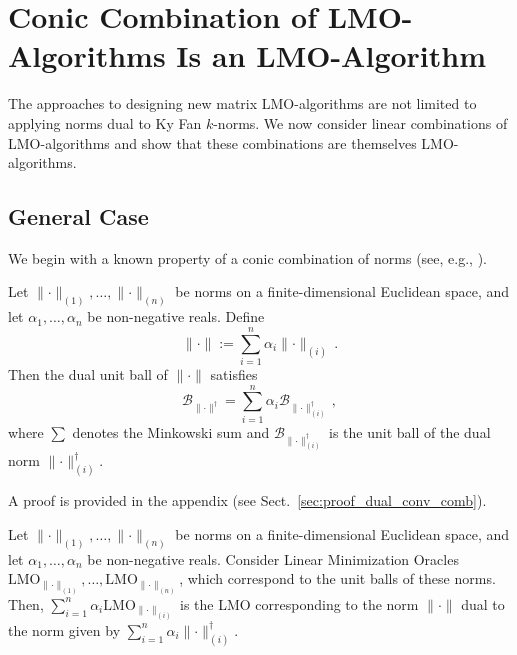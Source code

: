 \documentclass[smallextended,referee,envcountsect]{svjour3}
\newcommand{\cB}{\mathcal{B}}
\newcommand{\norm}[1]{\lVert #1\rVert}
\newcommand{\sectionref}[1]{Sect.~\ref{#1}}
\begin{document}
 \section{Conic Combination of LMO-Algorithms Is an LMO-Algorithm}
 \label{sec:conic_combo}
 
 The approaches to designing new matrix LMO-algorithms are not limited to applying norms dual to Ky Fan $k$-norms. We now consider linear combinations of LMO-algorithms and show that these combinations are themselves LMO-algorithms.
 
 \subsection{General Case}
 We begin with a known property of a conic combination of norms (see, e.g., \citep[Table 1]{yu2012arithmetic}).
 
 \begin{lemma}\label{lemma:dual_to_conv_comb}
   Let $\norm{\cdot}_{(1)}, \dots, \norm{\cdot}_{(n)}$ be norms on a finite-dimensional Euclidean space, and let $\alpha_1, \dots, \alpha_n$ be non-negative reals. Define
   \[
     \norm{\cdot} := \sum_{i = 1}^n \alpha_i \norm{\cdot}_{(i)}\,.
   \]
   Then the dual unit ball of $\norm{\cdot}$ satisfies
   \[
     \cB_{\norm{\cdot}^\dagger}
     = \sum_{i = 1}^n \alpha_i \cB_{\norm{\cdot}_{(i)}^\dagger}\,,
   \]
   where $\sum$ denotes the Minkowski sum and $\cB_{\norm{\cdot}_{(i)}^\dagger}$ is the unit ball of the dual norm $\norm{\cdot}_{(i)}^\dagger$.
 \end{lemma}
 
 A proof is provided in the appendix (see \sectionref{sec:proof_dual_conv_comb}).
 
 \begin{lemma}\label{lemma:lin_comb_lmo}
  Let $\norm{\cdot}_{(1)}, \dots, \norm{\cdot}_{(n)}$ be norms on a finite-dimensional Euclidean space, and let $\alpha_1, \dots, \alpha_n$ be non-negative reals. Consider Linear Minimization Oracles $\mathrm{LMO}_{\norm{\cdot}_{(1)}}, \dots, \mathrm{LMO}_{\norm{\cdot}_{(n)}}$, which correspond to the unit balls of these norms. Then, $\sum_{i = 1}^n \alpha_i \mathrm{LMO}_{\norm{\cdot}_{(i)}}$ is the LMO corresponding to the norm $\norm{\cdot}$ dual to the norm given by $\sum_{i = 1}^n \alpha_i \norm{\cdot}_{(i)}^\dagger$.
\end{lemma}
 
\end{document}
